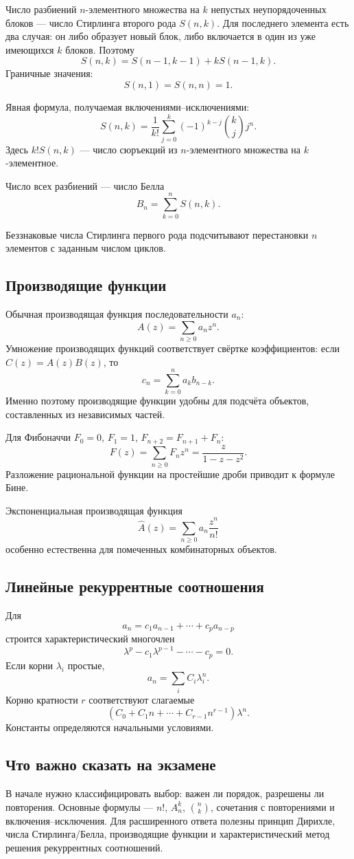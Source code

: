 Число разбиений $n$-элементного множества на $k$ непустых неупорядоченных
блоков --- число Стирлинга второго рода $S(n,k)$. Для последнего элемента есть
два случая: он либо образует новый блок, либо включается в один из уже имеющихся
$k$ блоков. Поэтому
\[
    S(n,k)=S(n-1,k-1)+kS(n-1,k).
\]
Граничные значения:
\[
    S(n,1)=S(n,n)=1.
\]

Явная формула, получаемая включениями--исключениями:
\[
    S(n,k)=\frac1{k!}\sum_{j=0}^{k}(-1)^{k-j}\binom kj j^n.
\]
Здесь $k!S(n,k)$ --- число сюръекций из $n$-элементного множества на
$k$-элементное.

Число всех разбиений --- число Белла
\[
    B_n=\sum_{k=0}^{n}S(n,k).
\]

Беззнаковые числа Стирлинга первого рода подсчитывают перестановки $n$ элементов
с заданным числом циклов.

\subsection{Производящие функции}

Обычная производящая функция последовательности $a_n$:
\[
    A(z)=\sum_{n\ge0}a_nz^n.
\]
Умножение производящих функций соответствует свёртке коэффициентов:
если $C(z)=A(z)B(z)$, то
\[
    c_n=\sum_{k=0}^{n}a_k b_{n-k}.
\]
Именно поэтому производящие функции удобны для подсчёта объектов, составленных
из независимых частей.

Для Фибоначчи $F_0=0$, $F_1=1$, $F_{n+2}=F_{n+1}+F_n$:
\[
 F(z)=\sum_{n\ge0}F_nz^n
 =\frac{z}{1-z-z^2}.
\]
Разложение рациональной функции на простейшие дроби приводит к формуле Бине.

Экспоненциальная производящая функция
\[
    \widehat A(z)=\sum_{n\ge0}a_n\frac{z^n}{n!}
\]
особенно естественна для помеченных комбинаторных объектов.

\subsection{Линейные рекуррентные соотношения}

Для
\[
 a_n=c_1a_{n-1}+\cdots+c_pa_{n-p}
\]
строится характеристический многочлен
\[
    \lambda^p-c_1\lambda^{p-1}-\cdots-c_p=0.
\]
Если корни $\lambda_i$ простые,
\[
    a_n=\sum_i C_i\lambda_i^n.
\]
Корню кратности $r$ соответствуют слагаемые
\[
    (C_0+C_1n+\cdots+C_{r-1}n^{r-1})\lambda^n.
\]
Константы определяются начальными условиями.

\subsection{Что важно сказать на экзамене}

В начале нужно классифицировать выбор: важен ли порядок, разрешены ли повторения.
Основные формулы --- $n!$, $A_n^k$, $\binom nk$, сочетания с повторениями и
включения--исключения. Для расширенного ответа полезны принцип Дирихле, числа
Стирлинга/Белла, производящие функции и характеристический метод решения
рекуррентных соотношений.

\newpage
